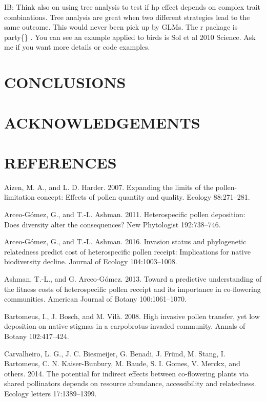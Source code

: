 \documentclass[11pt,a4paper]{article}
\begin{document}
IB: Think also on using tree analysis to test if hp effect depends on
complex trait combinations. Tree analysis are great when two different
strategies lead to the same outcome. This would never been pick up by
GLMs. The r package is party\{\} . You can see an example applied to
birds is Sol et al 2010 Science. Ask me if you want more details or code
examples.

\section{CONCLUSIONS}\label{conclusions}

\section{ACKNOWLEDGEMENTS}\label{acknowledgements}

\section{REFERENCES}\label{references}

\hypertarget{refs}{}
\hypertarget{ref-aizen2007}{}
Aizen, M. A., and L. D. Harder. 2007. Expanding the limits of the
pollen-limitation concept: Effects of pollen quantity and quality.
Ecology 88:271--281.

\hypertarget{ref-arceo2011}{}
Arceo-Gómez, G., and T.-L. Ashman. 2011. Heterospecific pollen
deposition: Does diversity alter the consequences? New Phytologist
192:738--746.

\hypertarget{ref-arceo2016}{}
Arceo-Gómez, G., and T.-L. Ashman. 2016. Invasion status and
phylogenetic relatedness predict cost of heterospecific pollen receipt:
Implications for native biodiversity decline. Journal of Ecology
104:1003--1008.

\hypertarget{ref-ashman2013}{}
Ashman, T.-L., and G. Arceo-Gómez. 2013. Toward a predictive
understanding of the fitness costs of heterospecific pollen receipt and
its importance in co-flowering communities. American Journal of Botany
100:1061--1070.

\hypertarget{ref-bartomeus2008}{}
Bartomeus, I., J. Bosch, and M. Vilà. 2008. High invasive pollen
transfer, yet low deposition on native stigmas in a carpobrotus-invaded
community. Annals of Botany 102:417--424.

\hypertarget{ref-carvalheiro2014}{}
Carvalheiro, L. G., J. C. Biesmeijer, G. Benadi, J. Fründ, M. Stang, I.
Bartomeus, C. N. Kaiser-Bunbury, M. Baude, S. I. Gomes, V. Merckx, and
others. 2014. The potential for indirect effects between co-flowering
plants via shared pollinators depends on resource abundance,
accessibility and relatedness. Ecology letters 17:1389--1399.
\end{document}
